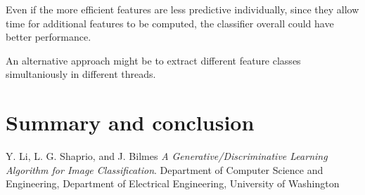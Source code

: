 \documentclass[11pt]{article}
\begin{document}
Even if the more efficient features are less predictive individually,
since they allow time for additional features to be computed, the
classifier overall could have better performance.

An alternative approach might be to extract different feature classes
simultaniously in different threads.


\section{Summary and conclusion}

\begin{thebibliography}{9}

  Y. Li, L. G. Shaprio, and J. Bilmes
  \emph{A Generative/Discriminative Learning Algorithm for Image Classification}.
  Department of Computer Science and Engineering,
  Department of Electrical Engineering,
  University of Washington

\end{thebibliography}
\end{document}
